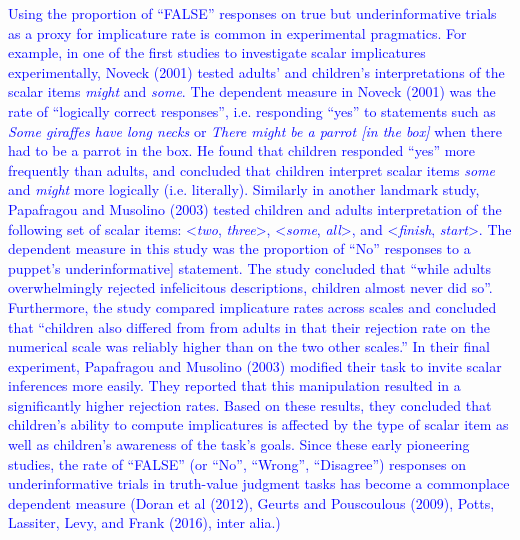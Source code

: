 \documentclass[man]{apa6}
\newcommand{\change}[1]{\textcolor{Blue}{#1}}
\theoremstyle{definition}
\theoremstyle{definition}
\theoremstyle{definition}
\theoremstyle{remark}
\begin{document}
\change{Using the proportion of \enquote{FALSE} responses on true but underinformative trials as a proxy for implicature rate is  common in experimental pragmatics. For example, in one of the first studies to investigate scalar implicatures experimentally, Noveck (2001) tested adults' and children's interpretations of the scalar items \emph{might} and \emph{some}. The dependent measure in Noveck (2001) was the rate of ``logically correct responses'', i.e. responding ``yes'' to statements such as \emph{Some giraffes have long necks} or \emph{There might be a parrot [in the box]} when there had to be a parrot in the box. He found that children responded ``yes'' more frequently than adults, and concluded that children interpret scalar items \emph{some} and \emph{might} more logically (i.e. literally). Similarly in another landmark study, Papafragou and Musolino (2003) tested children and adults interpretation of the following set of scalar items: <\emph{two}, \emph{three}>, <\emph{some}, \emph{all}>, and <\emph{finish}, \emph{start}>. The dependent measure in this study was the proportion of ``No'' responses to a puppet's underinformative] statement. The study concluded that ``while adults overwhelmingly rejected infelicitous descriptions, children almost never did so''. Furthermore, the study compared  implicature rates across scales and concluded that ``children also differed from from adults in that their rejection rate on the numerical scale was reliably higher than on the two other scales.'' In their final experiment, Papafragou and Musolino (2003) modified their task to invite scalar inferences more easily. They reported that this manipulation resulted in a significantly higher rejection rates. Based on these results, they concluded that children's ability to compute implicatures is affected by the type of scalar item as well as children's awareness of the task's goals. Since these early pioneering studies, the rate of ``FALSE'' (or ``No'', ``Wrong'', ``Disagree'') responses on underinformative trials in truth-value judgment tasks has become a commonplace dependent measure (Doran et al (2012),  Geurts and Pouscoulous (2009), Potts, Lassiter, Levy, and Frank (2016), inter alia.)}
\end{document}
